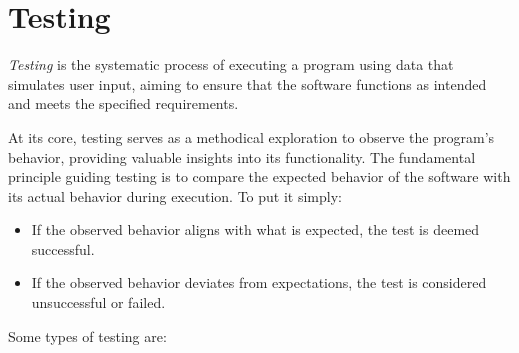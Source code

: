 \chapter{Testing}

\textit{Testing} is the systematic process of executing a program using data that simulates user input, aiming to ensure that the software functions as intended and meets the specified requirements.

At its core, testing serves as a methodical exploration to observe the program's behavior, providing valuable insights into its functionality. The fundamental principle guiding testing is to compare the expected behavior of the software with its actual behavior during execution. To put it simply:

\begin{itemize}
    \item If the observed behavior aligns with what is expected, the test is deemed successful.
    \item If the observed behavior deviates from expectations, the test is considered unsuccessful or failed.
\end{itemize}

\noindent Some types of testing are:

